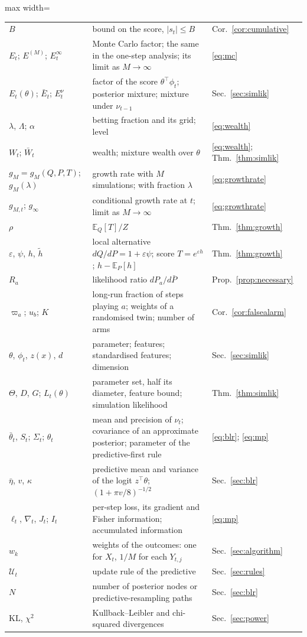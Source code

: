 \documentclass[12pt]{article}
\newcommand{\E}{\mathbb{E}}
\newcommand{\KL}{\mathrm{KL}}
\theoremstyle{remark}
\begin{document}
\begin{table}[h]
\begin{adjustbox}{max width=\textwidth}
\begin{tabular}{lll}
$B$ & bound on the score, $|s_t| \le B$ & Cor.~\ref{cor:cumulative} \\
$E_t$; $E^{(M)}$; $E_t^\infty$ & Monte Carlo factor; the same in the one-step analysis; its limit as $M \to \infty$ & \eqref{eq:mc} \\
$E_t(\theta)$; $\bar E_t$; $E_t^{\nu}$ & factor of the score $\theta^\top\phi_t$; posterior mixture; mixture under $\nu_{t-1}$ & Sec.~\ref{sec:simlik} \\
$\lambda$, $\Lambda$; $\alpha$ & betting fraction and its grid; level & \eqref{eq:wealth} \\
$W_t$; $\bar W_t$ & wealth; mixture wealth over $\theta$ & \eqref{eq:wealth}; Thm.~\ref{thm:simlik} \\
\midrule
$g_M = g_M(Q, P, T)$; $g_M(\lambda)$ & growth rate with $M$ simulations; with fraction $\lambda$ & \eqref{eq:growthrate} \\
$g_{M,t}$; $g_\infty$ & conditional growth rate at $t$; limit as $M \to \infty$ & \eqref{eq:growthrate} \\
$\rho$ & $\E_Q[T]/Z$ & Thm.~\ref{thm:growth} \\
$\varepsilon$, $\psi$, $h$, $\tilde h$ & local alternative $dQ/dP = 1 + \varepsilon\psi$; score $T = e^{\varepsilon h}$; $h - \E_P[h]$ & Thm.~\ref{thm:growth} \\
$R_a$ & likelihood ratio $dP_a/d\bar P$ & Prop.~\ref{prop:necessary} \\
$\varpi_a$; $u_b$; $K$ & long-run fraction of steps playing $a$; weights of a randomised twin; number of arms & Cor.~\ref{cor:falsealarm} \\
\midrule
$\theta$, $\phi_t$, $z(x)$, $d$ & parameter; features; standardised features; dimension & Sec.~\ref{sec:simlik} \\
$\Theta$, $D$, $G$; $L_t(\theta)$ & parameter set, half its diameter, feature bound; simulation likelihood & Thm.~\ref{thm:simlik} \\
$\bar\theta_t$, $S_t$; $\Sigma_t$; $\theta_t$ & mean and precision of $\nu_t$; covariance of an approximate posterior; parameter of the predictive-first rule & \eqref{eq:blr}; \eqref{eq:mp} \\
$\bar\eta$, $v$, $\kappa$ & predictive mean and variance of the logit $z^\top\theta$; $(1 + \pi v/8)^{-1/2}$ & Sec.~\ref{sec:blr} \\
$\ell_t$, $\nabla_t$, $J_t$; $I_t$ & per-step loss, its gradient and Fisher information; accumulated information & \eqref{eq:mp} \\
$w_k$ & weights of the outcomes: one for $X_t$, $1/M$ for each $Y_{t,j}$ & Sec.~\ref{sec:algorithm} \\
$\mathcal U_t$ & update rule of the predictive & Sec.~\ref{sec:rules} \\
$N$ & number of posterior nodes or predictive-resampling paths & Sec.~\ref{sec:blr} \\
\midrule
$\KL$, $\chi^2$ & Kullback--Leibler and chi-squared divergences & Sec.~\ref{sec:power} \\
\bottomrule
\end{tabular}
\end{adjustbox}
\end{table}
\end{document}
